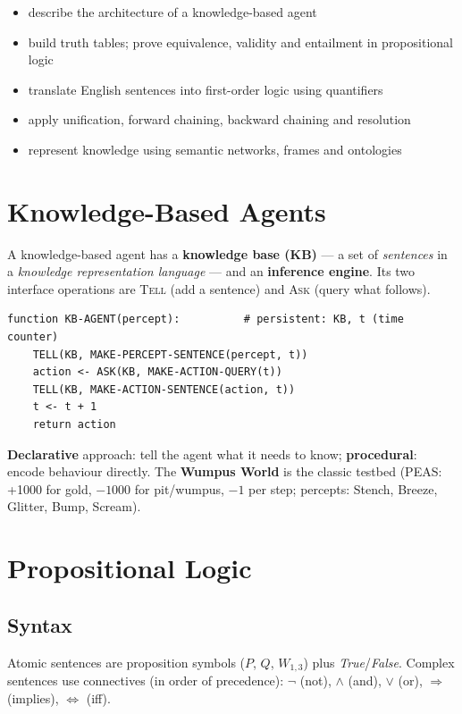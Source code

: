 
\begin{outcome}
\begin{itemize}
\item describe the architecture of a knowledge-based agent 
\item build truth tables; prove equivalence, validity and entailment in propositional logic 
\item translate English sentences into first-order logic using quantifiers 
\item apply unification, forward chaining, backward chaining and resolution 
\item represent knowledge using semantic networks, frames and ontologies 
\end{itemize}
\end{outcome}

\section{Knowledge-Based Agents}
A knowledge-based agent has a \textbf{knowledge base (KB)} --- a set of \emph{sentences} in a \emph{knowledge representation language} --- and an \textbf{inference engine}. Its two interface operations are \textsc{Tell} (add a sentence) and \textsc{Ask} (query what follows).
\begin{algo}[KB-Agent]
\begin{lstlisting}[numbers=none,backgroundcolor=\color{ivory},frame=none]
function KB-AGENT(percept):          # persistent: KB, t (time counter)
    TELL(KB, MAKE-PERCEPT-SENTENCE(percept, t))
    action <- ASK(KB, MAKE-ACTION-QUERY(t))
    TELL(KB, MAKE-ACTION-SENTENCE(action, t))
    t <- t + 1
    return action
\end{lstlisting}
\end{algo}
\textbf{Declarative} approach: tell the agent what it needs to know; \textbf{procedural}: encode behaviour directly. The \textbf{Wumpus World} is the classic testbed (PEAS: +1000 for gold, $-1000$ for pit/wumpus, $-1$ per step; percepts: Stench, Breeze, Glitter, Bump, Scream).

\section{Propositional Logic}
\subsection{Syntax}
Atomic sentences are proposition symbols ($P$, $Q$, $W_{1,3}$) plus \textit{True}/\textit{False}. Complex sentences use connectives (in order of precedence): $\neg$ (not), $\wedge$ (and), $\vee$ (or), $\Rightarrow$ (implies), $\Leftrightarrow$ (iff).

